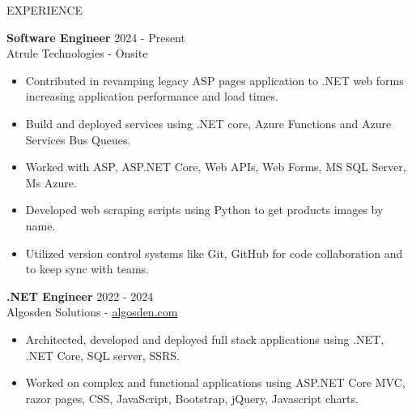 \documentclass{resume} %
\begin{document}


\begin{rSection}{EXPERIENCE}
	
	\textbf{Software Engineer} \hfill 2024 - Present\\
	Atrule Technologies - Onsite %
	\begin{itemize}
		\itemsep -3pt {} 
		\item Contributed in revamping legacy ASP pages application to .NET web forms increasing application performance and load times.
		\item Build and deployed services using .NET core, Azure Functions and Azure Services Bus Queues.
		\item Worked with ASP, ASP.NET Core, Web APIs, Web Forms, MS SQL Server, Ms Azure.
		
		\item Developed web scraping scripts using Python to get products images by name.
		\item Utilized version control systems like Git, GitHub for code collaboration and to keep sync with teams.
		
	\end{itemize}
	\textbf{.NET Engineer} \hfill 2022 - 2024\\
	Algosden Solutions -  \href{https://www.algosden.com/}{algosden.com}
	\begin{itemize}
		\itemsep -3pt {} 
		\item Architected, developed and deployed full stack applications using .NET, .NET Core, SQL server, SSRS.
		\item Worked on complex and functional applications using ASP.NET Core MVC, razor pages, CSS, JavaScript, Bootstrap, jQuery, Javascript charts.
		 
	\end{itemize}
	

\end{rSection}
\end{document}
